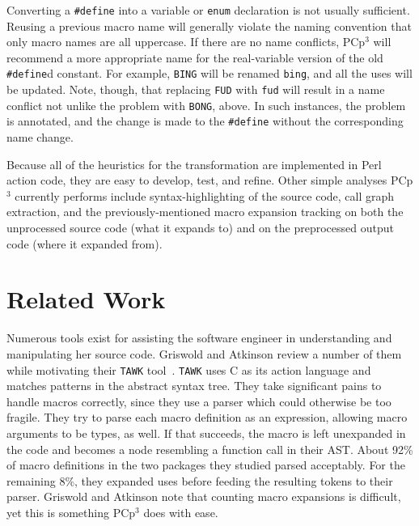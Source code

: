 \documentclass{article}
\newcommand{\pcp}{\mbox{\textsf{PCp}$^3$}}
\newcommand{\Perl}{\mbox{\textsf{Perl}}}
\newcommand{\C}{\mbox{\textsf{C}}}
\newcommand{\ppd}[1]{\texttt{\##1}}
\begin{document}
Converting a \ppd{define} into a variable or \texttt{enum} declaration
is not usually sufficient.  Reusing a previous macro name will generally
violate the naming convention that only macro names are all
uppercase. If there are no name conflicts, \pcp{} will recommend
a more appropriate name for the real-variable version of the old
\ppd{define}d constant.  For example, \texttt{BING} will be renamed
\texttt{bing}, and all the uses will be updated.  Note, though, that
replacing \texttt{FUD} with \texttt{fud} will result in a name conflict
not unlike the problem with \texttt{BONG}, above.  In such instances,
the problem is annotated, and the change is made to the \ppd{define}
without the corresponding name change.

Because all of the heuristics for the transformation are implemented in
\Perl{} action code, they are easy to develop, test, and refine.  Other
simple analyses \pcp{} currently performs include syntax-highlighting of
the source code, call graph extraction, and the previously-mentioned
macro expansion tracking on both the unprocessed source code (what it
expands to) and on the preprocessed output code (where it expanded
from).

\section{Related Work}
\label{sec:related}
Numerous tools exist for assisting the software engineer in
understanding and manipulating her source code.  Griswold and Atkinson
review a number of them while motivating their \texttt{TAWK} tool~\cite{Griswold96}.
\texttt{TAWK} uses \C{} as its action language and matches patterns in
the abstract syntax tree.  They take significant pains to handle macros
correctly, since they use a parser which could otherwise be too
fragile.  They try to parse each macro definition as an expression,
allowing macro arguments to be types, as well.  If that succeeds, the
macro is left unexpanded in the code and becomes a node resembling a
function call in their AST.  About 92\% of macro definitions in the two packages
they studied parsed acceptably.  For the remaining 8\%, they expanded
uses before feeding the resulting tokens to their parser.  Griswold and
Atkinson note that counting macro expansions is difficult, yet this is
something \pcp{} does with ease.
\end{document}
